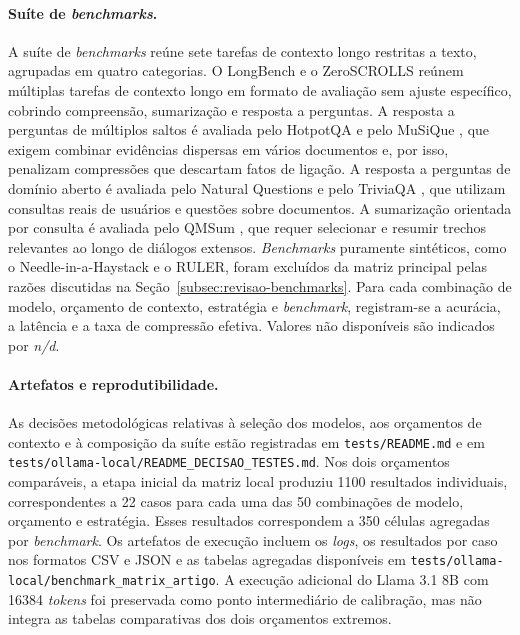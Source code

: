 \paragraph{Suíte de \textit{benchmarks}.}
A suíte de \textit{benchmarks} reúne sete tarefas de contexto longo restritas a texto, agrupadas em quatro categorias. O LongBench \cite{bai2023longbench} e o ZeroSCROLLS \cite{shaham2023zeroscrolls} reúnem múltiplas tarefas de contexto longo em formato de avaliação sem ajuste específico, cobrindo compreensão, sumarização e resposta a perguntas. A resposta a perguntas de múltiplos saltos é avaliada pelo HotpotQA \cite{yang2018hotpotqa} e pelo MuSiQue \cite{trivedi2022musique}, que exigem combinar evidências dispersas em vários documentos e, por isso, penalizam compressões que descartam fatos de ligação. A resposta a perguntas de domínio aberto é avaliada pelo Natural Questions \cite{kwiatkowski2019natural} e pelo TriviaQA \cite{joshi2017triviaqa}, que utilizam consultas reais de usuários e questões sobre documentos. A sumarização orientada por consulta é avaliada pelo QMSum \cite{zhong2021qmsum}, que requer selecionar e resumir trechos relevantes ao longo de diálogos extensos. \textit{Benchmarks} puramente sintéticos, como o Needle-in-a-Haystack e o RULER, foram excluídos da matriz principal pelas razões discutidas na Seção~\ref{subsec:revisao-benchmarks}. Para cada combinação de modelo, orçamento de contexto, estratégia e \textit{benchmark}, registram-se a acurácia, a latência e a taxa de compressão efetiva. Valores não disponíveis são indicados por \textit{n/d}.

\paragraph{Artefatos e reprodutibilidade.}
As decisões metodológicas relativas à seleção dos modelos, aos orçamentos de contexto e à composição da suíte estão registradas em \texttt{tests/README.md} e em \texttt{tests/ollama-local/README\_DECISAO\_TESTES.md}. Nos dois orçamentos comparáveis, a etapa inicial da matriz local produziu 1100 resultados individuais, correspondentes a 22 casos para cada uma das 50 combinações de modelo, orçamento e estratégia. Esses resultados correspondem a 350 células agregadas por \textit{benchmark}. Os artefatos de execução incluem os \textit{logs}, os resultados por caso nos formatos CSV e JSON e as tabelas agregadas disponíveis em \texttt{tests/ollama-local/benchmark\_matrix\_artigo}. A execução adicional do Llama 3.1 8B com 16384 \textit{tokens} foi preservada como ponto intermediário de calibração, mas não integra as tabelas comparativas dos dois orçamentos extremos.

